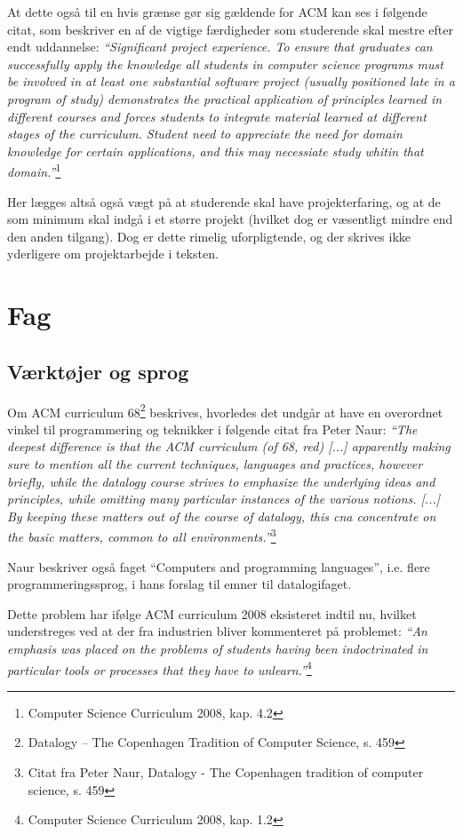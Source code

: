 \documentclass[10pt,a4paper]{article}
\newcommand{\citat}[2]{\vspace{0.1cm}\newline\textit{``#1''}\hspace{0.1cm}\footnote{#2}\vspace{0.1cm}\newline}
\begin{document}
At dette også til en hvis grænse gør sig gældende for ACM kan ses i følgende
citat, som beskriver en af de vigtige færdigheder som studerende skal mestre
efter endt uddannelse: \citat{\emph{Significant project experience}. To ensure
    that graduates can successfully apply the knowledge all students in computer
    science programs must be involved in at least one substantial software
    project (usually positioned late in a program of study) demonstrates the
    practical application of principles learned in different courses and forces
    students to integrate material learned at different stages of the
    curriculum. Student need to appreciate the need for domain knowledge for
    certain applications, and this may necessiate study whitin that
    domain.}{Computer Science Curriculum 2008, kap. 4.2}

Her lægges altså også vægt på at studerende skal have projekterfaring, og at de
som minimum skal indgå i et større projekt (hvilket dog er væsentligt mindre end
den anden tilgang). Dog er dette rimelig uforpligtende, og der skrives ikke
yderligere om projektarbejde i teksten.

\section{Fag}
\subsection{Værktøjer og sprog}
Om ACM curriculum 68\footnote{Datalogy -- The Copenhagen Tradition of Computer
    Science, s. 459} beskrives, hvorledes det undgår at have en overordnet
vinkel til programmering og teknikker i følgende citat fra Peter Naur:
\citat{The deepest difference is that the ACM curriculum (of 68, red) [...]
    apparently making sure to mention all the current techniques, languages and
    practices, however briefly, while the datalogy course strives to emphasize
    the underlying ideas and principles, while omitting many particular
    instances of the various notions. [...] By keeping these matters out of the
    course of datalogy, this cna concentrate on the basic matters, common to all
    environments.}{Citat fra Peter Naur, Datalogy - The Copenhagen tradition of
    computer science, s. 459}

Naur beskriver også faget ``Computers and programming languages'', i.e. flere
programmeringssprog, i hans forslag til emner til datalogifaget. 

Dette problem har ifølge ACM curriculum 2008 eksisteret indtil nu, hvilket
understreges ved at der fra industrien bliver kommenteret på problemet:
\citat{An emphasis was placed on the problems of students having been
    indoctrinated in particular tools or processes that they have to
    unlearn.}{Computer Science Curriculum 2008, kap. 1.2}
\end{document}
